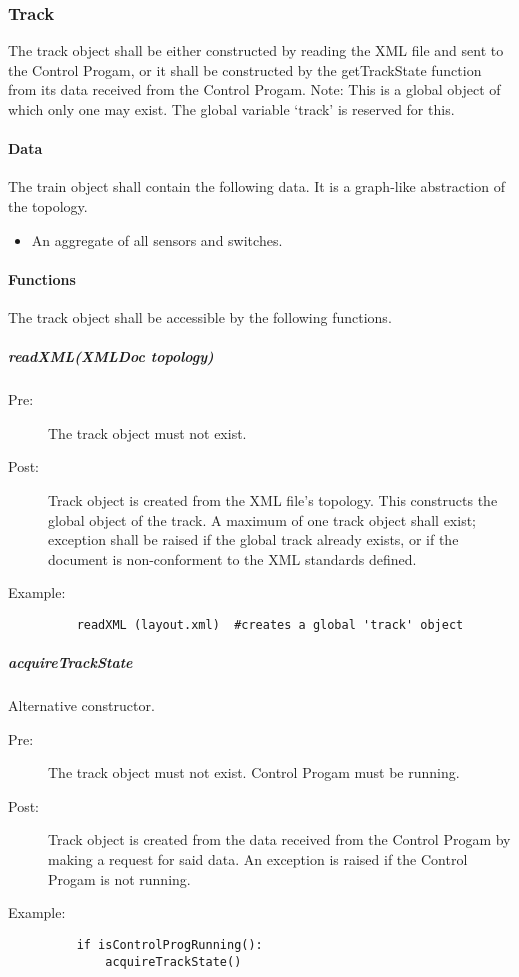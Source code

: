 \documentclass[a4paper,11pt,notitlepage]{article}
\def\CS{Control Progam\xspace}
\begin{document}

\subsubsection{Track}
The track object shall be either constructed by reading the XML file and sent to the \CS, or it shall be constructed by the getTrackState function from its data received from the \CS.
Note: This is a global object of which only one may exist. The global variable `track' is reserved for this.
\paragraph{Data}
The train object shall contain the following data. It is a graph-like abstraction of the topology.
\begin{itemize}
\item An aggregate of all sensors and switches.
\end{itemize}
\paragraph{Functions}
The track object shall be accessible by the following functions.

\subparagraph{readXML(XMLDoc topology)}
\begin{description}
\item[\hspace{1cm}Pre:] The track object must not exist.
\item[\hspace{1cm}Post:] Track object is created from the XML file's topology. This constructs the global object of the track. A maximum of one track object shall exist; exception shall be raised if the global track already exists, or if the document is non-conforment to the XML standards defined.
\item[\hspace{1cm}Example:]
\begin{verbatim}
    readXML (layout.xml)  #creates a global 'track' object
\end{verbatim}
\end{description}

\subparagraph{acquireTrackState} Alternative constructor.
\begin{description}
\item[\hspace{1cm}Pre:] The track object must not exist. \CS must be running.
\item[\hspace{1cm}Post:] Track object is created from the data received from the \CS by making a request for said data. An exception is raised if the \CS is not running.
\item[\hspace{1cm}Example:]
\begin{verbatim}
    if isControlProgRunning():
        acquireTrackState()
\end{verbatim}
\end{description}
\end{document}
